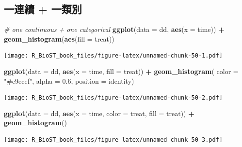 \documentclass[
]{book}
\newenvironment{Shaded}{\begin{snugshade}}{\end{snugshade}}
\newcommand{\CommentTok}[1]{\textcolor[rgb]{0.56,0.35,0.01}{\textit{#1}}}
\newcommand{\DataTypeTok}[1]{\textcolor[rgb]{0.13,0.29,0.53}{#1}}
\newcommand{\FloatTok}[1]{\textcolor[rgb]{0.00,0.00,0.81}{#1}}
\newcommand{\KeywordTok}[1]{\textcolor[rgb]{0.13,0.29,0.53}{\textbf{#1}}}
\newcommand{\NormalTok}[1]{#1}
\newcommand{\OperatorTok}[1]{\textcolor[rgb]{0.81,0.36,0.00}{\textbf{#1}}}
\newcommand{\StringTok}[1]{\textcolor[rgb]{0.31,0.60,0.02}{#1}}
\begin{document}
\hypertarget{ux4e00ux9023ux7e8c-ux4e00ux985eux5225}{%
\subsection{一連續 + 一類別}\label{ux4e00ux9023ux7e8c-ux4e00ux985eux5225}}

\begin{Shaded}
\begin{Highlighting}[]
\CommentTok{\# one continuous + one categorical}
\KeywordTok{ggplot}\NormalTok{(}\DataTypeTok{data =}\NormalTok{ dd, }\KeywordTok{aes}\NormalTok{(}\DataTypeTok{x =}\NormalTok{ time)) }\OperatorTok{+}\StringTok{ }
\StringTok{  }\KeywordTok{geom\_histogram}\NormalTok{(}\KeywordTok{aes}\NormalTok{(}\DataTypeTok{fill =}\NormalTok{ treat))}
\end{Highlighting}
\end{Shaded}

\texttt{[image: R\_BioST\_book\_files/figure-latex/unnamed-chunk-50-1.pdf]}

\begin{Shaded}
\begin{Highlighting}[]
\KeywordTok{ggplot}\NormalTok{(}\DataTypeTok{data =}\NormalTok{ dd, }\KeywordTok{aes}\NormalTok{(}\DataTypeTok{x =}\NormalTok{ time, }\DataTypeTok{fill =}\NormalTok{ treat)) }\OperatorTok{+}
\StringTok{    }\KeywordTok{geom\_histogram}\NormalTok{( }\DataTypeTok{color =} \StringTok{"\#e9ecef"}\NormalTok{, }
                    \DataTypeTok{alpha =} \FloatTok{0.6}\NormalTok{, }
                    \DataTypeTok{position =} \StringTok{\textquotesingle{}identity\textquotesingle{}}\NormalTok{)}
\end{Highlighting}
\end{Shaded}

\texttt{[image: R\_BioST\_book\_files/figure-latex/unnamed-chunk-50-2.pdf]}

\begin{Shaded}
\begin{Highlighting}[]
\KeywordTok{ggplot}\NormalTok{(}\DataTypeTok{data =}\NormalTok{ dd, }\KeywordTok{aes}\NormalTok{(}\DataTypeTok{x =}\NormalTok{ time, }\DataTypeTok{color =}\NormalTok{ treat, }\DataTypeTok{fill =}\NormalTok{ treat)) }\OperatorTok{+}
\StringTok{    }\KeywordTok{geom\_histogram}\NormalTok{()}
\end{Highlighting}
\end{Shaded}

\texttt{[image: R\_BioST\_book\_files/figure-latex/unnamed-chunk-50-3.pdf]}
\end{document}
